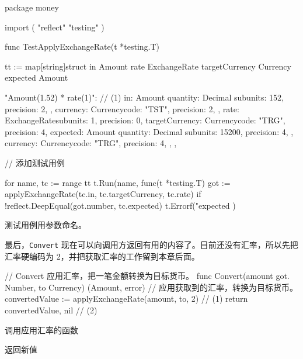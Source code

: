 \begin{gocode}[title={代码清单 6.22 \texttt{convert\_internal\_test.go}：测试 \texttt{applyExchangeRate}}]
package money

import (
    "reflect"
    "testing"
)

func TestApplyExchangeRate(t *testing.T) {
    tt := map[string]struct {
        in              Amount
        rate            ExchangeRate
        targetCurrency Currency
        expected        Amount
    }{
        "Amount(1.52) * rate(1)": { // (1)
             in: Amount{
                 quantity: Decimal{
                     subunits: 152,
                     precision: 2,
                 },
                 currency: Currency{code: "TST", precision: 2},
             },
             rate:           ExchangeRate{subunits: 1, precision: 0},
             targetCurrency: Currency{code: "TRG", precision: 4},
             expected: Amount{
                 quantity: Decimal{
                     subunits: 15200,
                     precision: 4,
                 },
                 currency: Currency{code: "TRG", precision: 4},
             },
        },

        // 添加测试用例
    }

    for name, tc := range tt {
        t.Run(name, func(t *testing.T) {
            got := applyExchangeRate(tc.in, tc.targetCurrency, tc.rate)
            if !reflect.DeepEqual(got.number, tc.expected) {
                t.Errorf("expected %
            }
        })
    }
}
\end{gocode}

\begin{codeannotations}
\item 测试用例用参数命名。
\end{codeannotations}

最后，\texttt{Convert} 现在可以向调用方返回有用的内容了。目前还没有汇率，所以先把汇率硬编码为 2，并把获取汇率的工作留到本章后面。

\begin{gocode}[title={代码清单 6.23 \texttt{convert.go}：\texttt{Convert} 的第一个实现}]
// Convert 应用汇率，把一笔金额转换为目标货币。
func Convert(amount got. Number, to Currency) (Amount, error) {
    // 应用获取到的汇率，转换为目标货币。
    convertedValue := applyExchangeRate(amount, to, 2) // (1)
    return convertedValue, nil // (2)
}
\end{gocode}

\begin{codeannotations}
\item 调用应用汇率的函数
\item 返回新值
\end{codeannotations}

